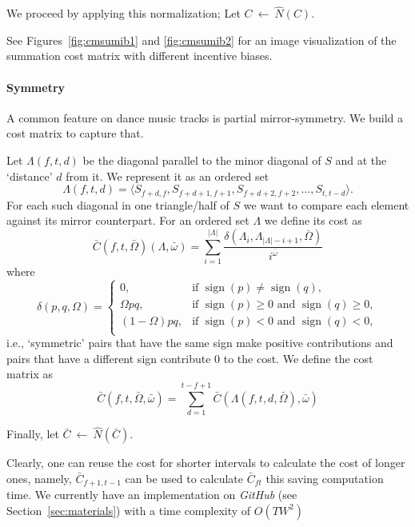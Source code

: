 \documentclass[twocolumn]{article}
\newcommand{\sign}{\mathop{\mathrm{sign}}}
\begin{document}
	
	We proceed by applying this normalization; Let $C~\leftarrow~\hat N(C)$.
	
	See Figures~\ref{fig:cmsumib1} and \ref{fig:cmsumib2} for an image visualization of the summation cost matrix with different incentive biases.
	
	\paragraph{Symmetry}	
	
A common feature on dance music tracks is partial mirror-symmetry. We build a cost matrix to capture that.
	
Let $\Lambda(f,t,d)$ be the diagonal parallel to the minor diagonal
of $S$ and at the `distance' $d$ from it. We represent it as an ordered set
\begin{dmath*}
\Lambda(f,t,d)
 = \langle S_{f+d,f}, S_{f+d+1, f+1}, S_{f+d+2, f+2},\ldots, S_{t, t-d}\rangle.
	\end{dmath*} 
For each such diagonal in one triangle/half of $S$ we want to compare
each element against its mirror counterpart. For an ordered set
$\Lambda$ we define its cost as
\begin{dmath*}
\bar C(f,t,\bar \Omega)(\Lambda, \bar \omega)=\sum_{i=1}^{|\Lambda|} \frac{ \delta(\Lambda_i,\Lambda_{|\Lambda|-i+1},\bar \Omega)}{i^{\bar \omega}}
\end{dmath*}
where
\begin{dmath*}
\delta(p,q,\Omega) = 
\left\{\begin{array}{ll}
0,  & \text{if~}\sign( p ) \ne \sign( q ),\\
\Omega pq,   & \text{if~}  \sign(p) \ge 0 \text{~and~} \sign(q) \ge 0 ,  \\
(1-\Omega)pq,  & \text{if~} \sign(p) < 0 \text{~and~} \sign(q) < 0, \\
\end{array}\right.
\end{dmath*}
i.e., `symmetric' pairs that have the same sign make positive
contributions and pairs that have a different sign contribute $0$ to
the cost. We define the cost matrix as
\begin{dmath*}
\bar C(f,t,\bar \Omega, \bar \omega) = \sum_{d=1}^{t-f+1}\bar C(\Lambda(f,t,d,\bar \Omega), \bar \omega)
\end{dmath*}

Finally, let $\bar C~\leftarrow~\hat N(\bar C)$.

Clearly, one can reuse the cost for shorter intervals to calculate the
cost of longer ones, namely, $\bar C_{f+1,t-1}$ can be used to
calculate $\bar C_{ft}$ this saving computation time. We currently have an implementation on \textit{GitHub} (see Section~\ref{sec:materials}) with a time complexity of $O(TW^2)$
\end{document}
